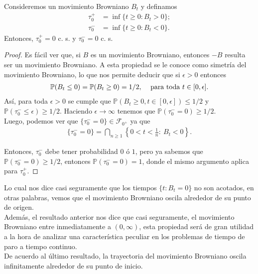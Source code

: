 \begin{proposition}
Consideremos un movimiento Browniano $B_t$ y definamos
	\begin{align*}
	\tau_0^{+} & = \inf \{ t \geq 0 : B_t > 0 \}; \\
	\tau_0^{-} & = \inf \{ t \geq 0 : B_t < 0 \}.
	\end{align*}
Entonces, $\tau_0^{+} = 0$ c. s. y $\tau_0^{-} = 0$ c. s. 
\end{proposition}
\begin{proof}
Es fácil ver que, si $B$ es un movimiento Browniano, entonces $-B$ resulta ser un movimiento Browniano. A esta propiedad se le conoce como simetría del movimiento Browniano, lo que nos permite deducir que si $\epsilon > 0$ entonces
	\begin{align*}
	\mathbb{P} (B_t \leq 0) = \mathbb{P} (B_t \geq 0) = 1/2, \hspace{0.3cm} \text{ para toda } t \in [0, \epsilon].
	\end{align*}
Así, para toda $\epsilon > 0$ se cumple que $\mathbb{P} (B_t \geq 0, t \in [0, \epsilon]) \leq 1/2$ y $\mathbb{P}(\tau_0^{-} \leq \epsilon) \geq 1/2$. Haciendo $\epsilon \rightarrow \infty$ tenemos que $\mathbb{P}(\tau_0^{-} = 0) \geq 1/2$. \\

Luego, podemos ver que $\{\tau_0^{-} = 0\} \in \mathcal{F}_{0^{+}}$ ya que 
	\begin{align*}
	\{\tau_0^{-} = 0\} = \bigcap_{n \geq 1} \left\{ 0 < t < \frac{1}{n}: \ B_t < 0 \right\}.
	\end{align*}

Entonces, $\tau_0^{-}$ debe tener probabilidad $0$ ó $1$, pero ya sabemos que $\mathbb{P}(\tau_0^{-} = 0) \geq 1/2$, entonces $\mathbb{P}(\tau_0^{-} = 0) = 1$, donde el mismo argumento aplica para $\tau_0^{+}$. 
\end{proof}

Lo cual nos dice casi seguramente que los tiempos $\{t : B_t = 0\}$ no son acotados, en otras palabras, vemos que el movimiento Browniano oscila alrededor de su punto de origen. \\

Además, el resultado anterior nos dice que casi seguramente, el movimiento Browniano entre inmediatamente a $(0, \infty)$, esta propiedad será de gran utilidad a la hora de analizar una característica peculiar en los problemas de tiempo de paro a tiempo continuo. \\

De acuerdo al último resultado, la trayectoria del movimiento Browniano oscila infinitamente alrededor de su punto de inicio.

